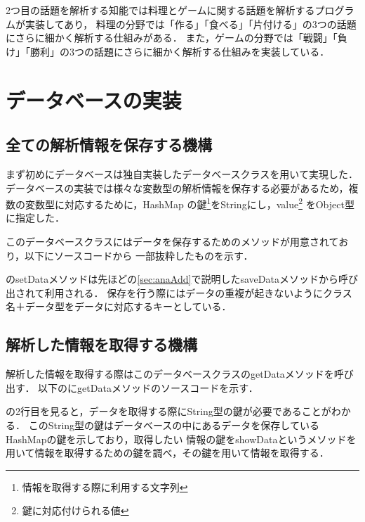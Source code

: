 2つ目の話題を解析する知能では料理とゲームに関する話題を解析するプログラムが実装してあり，
料理の分野では「作る」「食べる」「片付ける」の3つの話題にさらに細かく解析する仕組みがある．
また，ゲームの分野では「戦闘」「負け」「勝利」の3つの話題にさらに細かく解析する仕組みを実装している．


\section{データベースの実装}
\subsection{全ての解析情報を保存する機構}
まず初めにデータベースは独自実装したデータベースクラスを用いて実現した．
データベースの実装では様々な変数型の解析情報を保存する必要があるため，複数の変数型に対応するために，HashMap
の鍵\footnote{情報を取得する際に利用する文字列}をStringにし，value\footnote{鍵に対応付けられる値}
をObject型に指定した．

このデータベースクラスにはデータを保存するためのメソッドが用意されており，以下にソースコードから
一部抜粋したものを示す．


のsetDataメソッドは先ほどの\ref{sec:anaAdd}で説明したsaveDataメソッドから呼び出されて利用される．
保存を行う際にはデータの重複が起きないようにクラス名＋データ型をデータに対応するキーとしている．

\subsection{解析した情報を取得する機構}
解析した情報を取得する際はこのデータベースクラスのgetDataメソッドを呼び出す．
以下のにgetDataメソッドのソースコードを示す．


の2行目を見ると，データを取得する際にString型の鍵が必要であることがわかる．
このString型の鍵はデータベースの中にあるデータを保存しているHashMapの鍵を示しており，取得したい
情報の鍵をshowDataというメソッドを用いて情報を取得するための鍵を調べ，その鍵を用いて情報を取得する．

